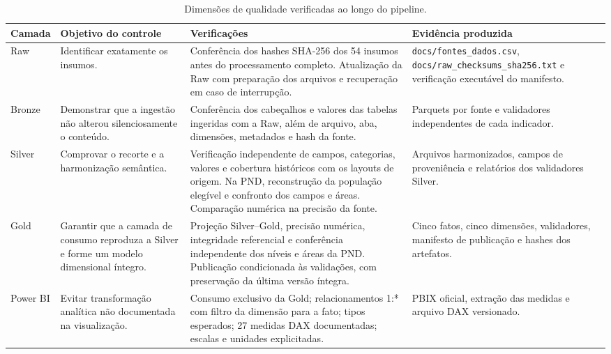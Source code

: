 \begin{landscape}
\begin{table}[H]
\centering
\scriptsize
\caption{Dimensões de qualidade verificadas ao longo do pipeline.}
\label{tab:ap-qualidade-camadas}
\renewcommand{\arraystretch}{1.18}
\begin{tabular}{|p{2.5cm}|p{5.0cm}|p{8.0cm}|p{6.0cm}|}
\hline
\textbf{Camada} & \textbf{Objetivo do controle} & \textbf{Verificações} & \textbf{Evidência produzida} \\ \hline
Raw & Identificar exatamente os insumos. & Conferência dos hashes SHA-256 dos 54 insumos antes do processamento completo. Atualização da Raw com preparação dos arquivos e recuperação em caso de interrupção. & \texttt{docs/fontes\_dados.csv}, \texttt{docs/raw\_checksums\_sha256.txt} e verificação executável do manifesto. \\ \hline
Bronze & Demonstrar que a ingestão não alterou silenciosamente o conteúdo. & Conferência dos cabeçalhos e valores das tabelas ingeridas com a Raw, além de arquivo, aba, dimensões, metadados e hash da fonte. & Parquets por fonte e validadores independentes de cada indicador. \\ \hline
Silver & Comprovar o recorte e a harmonização semântica. & Verificação independente de campos, categorias, valores e cobertura históricos com os layouts de origem. Na PND, reconstrução da população elegível e confronto dos campos e áreas. Comparação numérica na precisão da fonte. & Arquivos harmonizados, campos de proveniência e relatórios dos validadores Silver. \\ \hline
Gold & Garantir que a camada de consumo reproduza a Silver e forme um modelo dimensional íntegro. & Projeção Silver--Gold, precisão numérica, integridade referencial e conferência independente dos níveis e áreas da PND. Publicação condicionada às validações, com preservação da última versão íntegra. & Cinco fatos, cinco dimensões, validadores, manifesto de publicação e hashes dos artefatos. \\ \hline
Power BI & Evitar transformação analítica não documentada na visualização. & Consumo exclusivo da Gold; relacionamentos 1:* com filtro da dimensão para a fato; tipos esperados; 27 medidas DAX documentadas; escalas e unidades explicitadas. & PBIX oficial, extração das medidas e arquivo DAX versionado. \\ \hline
\end{tabular}
\end{table}
\end{landscape}

